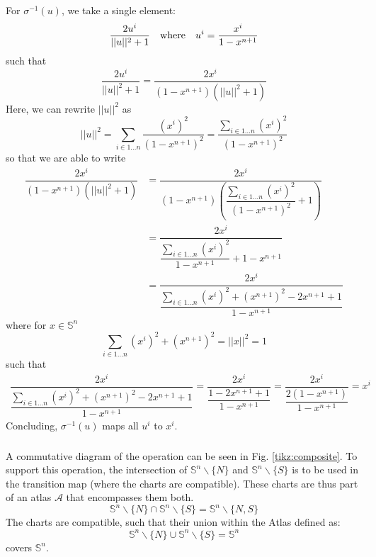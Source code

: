 \subsubsection{}
For $\sigma^{-1}(u)$, we take a single element:
\[
	\dfrac{2u^i}{||u||^2 + 1} \quad \textnormal{where} \quad u^i = \dfrac{x^i}{1-x^{n+1}}
\]
such that
\[
	\dfrac{2u^i}{||u||^2 + 1} = \dfrac{2x^i}{(1-x^{n+1})(||u||^2 + 1)}
\]
Here, we can rewrite $||u||^2$ as
\[
||u||^2 = \sum_{i\in 1\dots n}\dfrac{(x^i)^2}{(1-x^{n+1})^2} = \dfrac{\sum_{i\in 1\dots n}(x^i)^2}{(1-x^{n+1})^2}
\]
so that we are able to write 
\[
\begin{split}
\dfrac{2x^i}{(1-x^{n+1})(||u||^2 + 1)} &= \dfrac{2x^i}{(1-x^{n+1})\left(\dfrac{\sum_{i\in 1\dots n}(x^i)^2}{(1-x^{n+1})^2} + 1\right)} \\
&= \dfrac{2x^i}{\dfrac{\sum_{i\in 1\dots n}(x^i)^2}{1-x^{n+1}} + 1-x^{n+1}}\\
&= \dfrac{2x^i}{\dfrac{\sum_{i\in 1\dots n}(x^i)^2 + (x^{n+1})^2 -2x^{n+1} + 1}{1-x^{n+1}}}
\end{split} 
\]
where for $x\in \mathbb{S}^n$
\[
\sum_{i\in 1\dots n}(x^i)^2 + (x^{n+1})^2 = ||x||^2 = 1
\]
such that
\[
\begin{split}
	\dfrac{2x^i}{\dfrac{\sum_{i\in 1\dots n}(x^i)^2 + (x^{n+1})^2 -2x^{n+1} + 1}{1-x^{n+1}}} = \dfrac{2x^i}{\dfrac{1 - 2x^{n+1} + 1}{1-x^{n+1}}} = \dfrac{2x^i}{\dfrac{2(1 - x^{n+1})}{1-x^{n+1}}} = x^i
\end{split} 
\]
Concluding, $\sigma^{-1}(u)$ maps all $u^i$ to $x^i$.

\subsubsection{}
A commutative diagram of the operation can be seen in Fig. \ref{tikz:composite}. To support this operation, the intersection of $ \mathbb{S}^n \backslash \{N\}$ and $ \mathbb{S}^n \backslash \{S\}$ is to be used in the transition map (where the charts are compatible). These charts are thus part of an atlas $\mathcal{A}$ that encompasses them both.
\[
 \mathbb{S}^n \backslash \{N\} \cap  \mathbb{S}^n \backslash \{S\} =  \mathbb{S}^n \backslash \{N, S\}
\]
The charts are compatible, such that their union within the Atlas defined as:
\[
	 \mathbb{S}^n \backslash \{N\} \cup  \mathbb{S}^n \backslash \{S\} =  \mathbb{S}^n
\]
covers $\mathbb{S}^n$.

